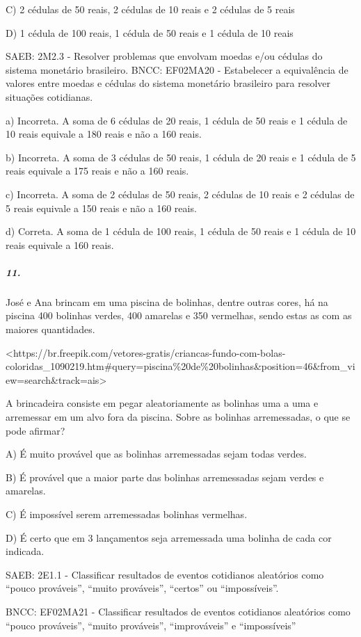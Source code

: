 C) 2 cédulas de 50 reais, 2 cédulas de 10 reais e 2 cédulas de 5 reais

D) 1 cédula de 100 reais, 1 cédula de 50 reais e 1 cédula de 10 reais

SAEB: 2M2.3 - Resolver problemas que envolvam moedas e/ou cédulas do
sistema monetário brasileiro. BNCC: EF02MA20 - Estabelecer a
equivalência de valores entre moedas e cédulas do sistema monetário
brasileiro para resolver situações cotidianas.

a) Incorreta. A soma de 6 cédulas de 20 reais, 1 cédula de 50 reais e 1
cédula de 10 reais equivale a 180 reais e não a 160 reais.

b) Incorreta. A soma de 3 cédulas de 50 reais, 1 cédula de 20 reais e 1
cédula de 5 reais equivale a 175 reais e não a 160 reais.

c) Incorreta. A soma de 2 cédulas de 50 reais, 2 cédulas de 10 reais e 2
cédulas de 5 reais equivale a 150 reais e não a 160 reais.

d) Correta. A soma de 1 cédula de 100 reais, 1 cédula de 50 reais e 1
cédula de 10 reais equivale a 160 reais.

\subparagraph{11. }\label{section-140}

José e Ana brincam em uma piscina de bolinhas, dentre outras cores, há
na piscina 400 bolinhas verdes, 400 amarelas e 350 vermelhas, sendo
estas as com as maiores quantidades.

\textless{}https://br.freepik.com/vetores-gratis/criancas-fundo-com-bolas-coloridas\_1090219.htm\#query=piscina\%20de\%20bolinhas\&position=46\&from\_view=search\&track=ais\textgreater{}

A brincadeira consiste em pegar aleatoriamente as bolinhas uma a uma e
arremessar em um alvo fora da piscina. Sobre as bolinhas arremessadas, o
que se pode afirmar?

A) É muito provável que as bolinhas arremessadas sejam todas verdes.

B) É provável que a maior parte das bolinhas arremessadas sejam verdes e
amarelas.

C) É impossível serem arremessadas bolinhas vermelhas.

D) É certo que em 3 lançamentos seja arremessada uma bolinha de cada cor
indicada.

SAEB: 2E1.1 - Classificar resultados de eventos cotidianos aleatórios
como ``pouco prováveis'', ``muito prováveis'', ``certos'' ou
``impossíveis''.

BNCC: EF02MA21 - Classificar resultados de eventos cotidianos aleatórios
como ``pouco prováveis'', ``muito prováveis'', ``improváveis'' e
``impossíveis''


